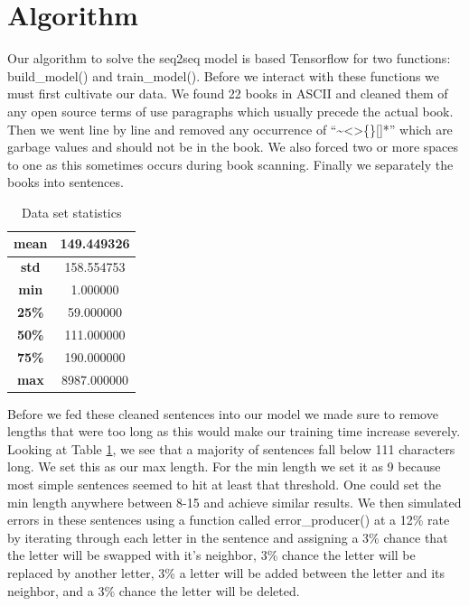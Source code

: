 \documentclass[11pt,a4paper]{scrartcl}
\theoremstyle{definition}
\begin{document}
\section{Algorithm}
Our algorithm to solve the seq2seq model is based Tensorflow for two functions: build\_model() and train\_model(). Before we interact with these functions we must first cultivate our data. We found 22 books in ASCII and cleaned them of any open source terms of use paragraphs which usually precede the actual book. Then we went line by line and removed any occurrence of “\textasciitilde<>\{\}[]*” which are garbage values and should not be in the book. We also forced two or more spaces to one as this sometimes occurs during book scanning. Finally we separately the books into sentences.\newline

\FloatBarrier
\begin{table}
\begin{center}
\begin{tabular}{ |c|c|} 
\hline
\textbf{mean} & 149.449326 \\
\hline
\textbf{std} & 158.554753 \\
\hline
\textbf{min} & 1.000000 \\
\hline
\textbf{25\%} & 59.000000 \\
\hline
\textbf{50\%} & 111.000000 \\
\hline
\textbf{75\%} & 190.000000 \\
\hline
\textbf{max} & 8987.000000 \\
\hline
\end{tabular}
\caption{Data set statistics} 
\label{datastats}
\end{center}
\end{table}

Before we fed these cleaned sentences into our model we made sure to remove lengths that were too long as this would make our training time increase severely. Looking at Table \ref{datastats}, we see that a majority of sentences fall below 111 characters long. We set this as our max length. For the min length we set it as 9 because most simple sentences seemed to hit at least that threshold. One could set the min length anywhere between 8-15 and achieve similar results. We then simulated errors in these sentences using a function called error\_producer() at a 12\% rate by iterating through each letter in the sentence and assigning a 3\% chance that the letter will be swapped with it’s neighbor, 3\% chance the letter will be replaced by another letter, 3\% a letter will be added between the letter and its neighbor, and a 3\% chance the letter will be deleted.
\end{document}
